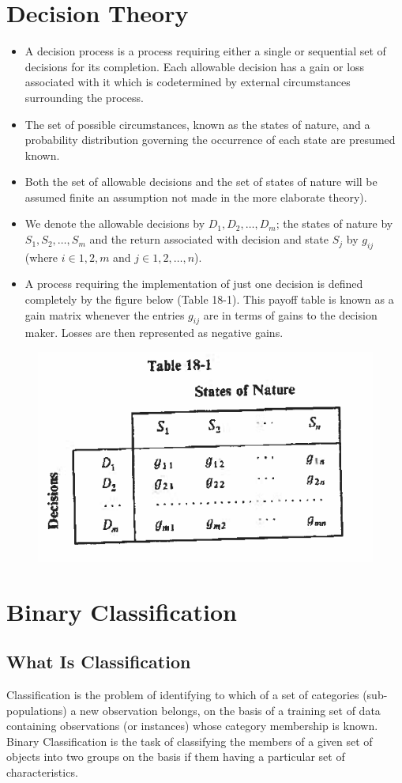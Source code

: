\documentclass[]{report}
\begin{document}
\section*{Decision Theory }
\begin{itemize}
    \item A decision process is a process requiring either a single or sequential set of decisions for its completion. Each allowable decision has a gain or loss associated with it which is codetermined by external circumstances surrounding the process. 
    \item The set of possible circumstances, known as the states of nature, and a probability distribution governing the occurrence of each state are presumed known.
    \item Both the set of allowable decisions and the set of states of nature will be assumed finite an assumption not made in the more elaborate theory). 
    \item We denote the allowable decisions by $D_1, D_2, \ldots ,D_m$; the states of nature by $S_1, S_2, \ldots ,S_m$ and the return associated with decision and state $S_j$ by $g_{ij}$ (where $ i \in 1,2,m$ and $j \in 1,2,\ldots,n$). 
    \item A process requiring the implementation of just one decision is defined completely by the figure below (Table 18-1). This payoff table is known as a gain matrix whenever the entries $g_{ij}$ are in terms of gains to the decision maker. Losses are then represented as negative gains. 
\end{itemize} 
	\begin{figure}[h!]
\centering
\includegraphics[width=0.4\linewidth]{images/A18-325-A}
\end{figure}

\section*{Binary Classification}
\subsection*{What Is Classification}
Classification is the problem of identifying to which of a set of categories
(sub-populations) a new observation belongs, on the basis of a training set
of data containing observations (or instances) whose category membership is
known. Binary Classification is the task of classifying the members of a given set of objects into two groups on the basis
if them having a particular set of characteristics.
\end{document}
